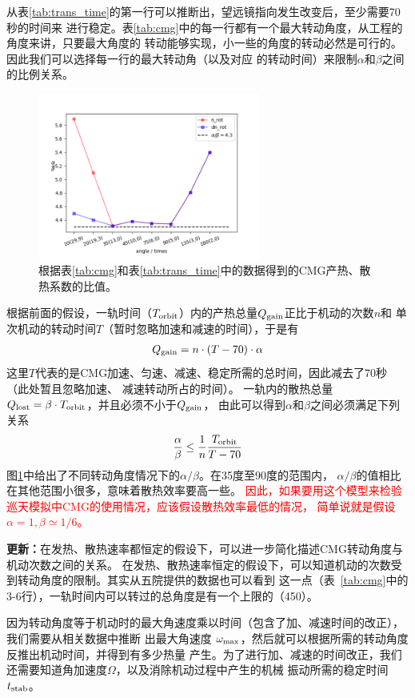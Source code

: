 \documentclass[a4paper,11pt]{ctexart}
\newcommand{\RT}[1]{\textcolor{red}{#1}}
\begin{document}
从表\ref{tab:trans_time}的第一行可以推断出，望远镜指向发生改变后，至少需要70秒的时间来
进行稳定。表\ref{tab:cmg}中的每一行都有一个最大转动角度，从工程的角度来讲，只要最大角度的
转动能够实现，小一些的角度的转动必然是可行的。因此我们可以选择每一行的最大转动角（以及对应
的转动时间）来限制$\alpha$和$\beta$之间的比例关系。

\begin{figure}[h!]
\centering
\includegraphics[width=0.65\textwidth]{figures/CMG_alpha2beta.png}
\caption{根据表\ref{tab:cmg}和表\ref{tab:trans_time}中的数据得到的CMG产热、散热系数的比值。}
\label{fig:cmg_alpha_beta}
\end{figure}

根据前面的假设，一轨时间（$T_{\rm orbit}$）内的产热总量$Q_{\rm gain}$正比于机动的次数$n$和
单次机动的转动时间$T$（暂时忽略加速和减速的时间），于是有
\begin{eqnarray}
Q_{\rm gain} = n\cdot (T-70)\cdot \alpha
\end{eqnarray}
这里$T$代表的是CMG加速、匀速、减速、稳定所需的总时间，因此减去了70秒（此处暂且忽略加速、
减速转动所占的时间）。
一轨内的散热总量$Q_{\rm lost}=\beta\cdot T_{\rm orbit}$，并且必须不小于$Q_{\rm gain}$，
由此可以得到$\alpha$和$\beta$之间必须满足下列关系
\begin{eqnarray}
\frac{\alpha}{\beta} \le \frac{1}{n} \frac{T_{\rm orbit}}{T-70}
\end{eqnarray}
图\ref{fig:cmg_alpha_beta}中给出了不同转动角度情况下的$\alpha / \beta$。在35度至90度的范围内，
$\alpha / \beta$的值相比在其他范围小很多，意味着散热效率要高一些。
\RT{\heiti 因此，如果要用这个模型来检验巡天模拟中CMG的使用情况，应该假设散热效率最低的情况，
简单说就是假设$\alpha=1,\beta\simeq 1/6$。}

{\kaishu
\textbf{更新：}在发热、散热速率都恒定的假设下，可以进一步简化描述CMG转动角度与机动次数之间的关系。
在发热、散热速率恒定的假设下，可以知道机动的次数受到转动角度的限制。其实从五院提供的数据也可以看到
这一点（表~\ref{tab:cmg}中的3-6行），一轨时间内可以转过的总角度是有一个上限的（450\textdegree）。

因为转动角度等于机动时的最大角速度乘以时间（包含了加、减速时间的改正），我们需要从相关数据中推断
出最大角速度 $\omega_{\rm max}$，然后就可以根据所需的转动角度反推出机动时间，并得到有多少热量
产生。为了进行加、减速的时间改正，我们还需要知道角加速度$\Omega$，以及消除机动过程中产生的机械
振动所需的稳定时间$t_{\rm stab}$。
}
\end{document}
